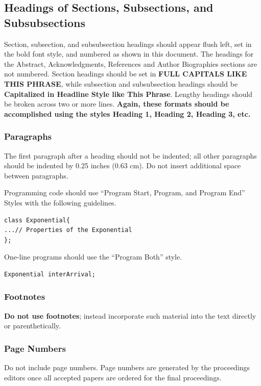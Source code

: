 \documentclass{wscpaperproc}
\theoremstyle{wsc}
\begin{document}
\subsection{Headings of Sections, Subsections, and Subsubsections}
Section, subsection, and subsubsection headings should appear flush left, set in the bold font style, and numbered as shown in this document. The headings for the Abstract, Acknowledgments, References and Author Biographies sections are not numbered. Section headings should be set in \textbf{FULL CAPITALS LIKE THIS PHRASE}, while subsection and subsubsection headings should be \textbf{Capitalized in Headline Style like This Phrase}. Lengthy headings should be broken across two or more lines. \textbf{Again, these formats should be accomplished using the styles Heading 1, Heading 2, Heading 3, etc.}

\subsubsection{Paragraphs}
The first paragraph after a heading should not be indented; all other paragraphs should be indented by 0.25 inches (0.63 cm). Do not insert additional space between paragraphs.

Programming code should use “Program Start, Program, and Program End” Styles with the following guidelines.

\begin{verbatim}
class Exponential{
...// Properties of the Exponential
};
\end{verbatim}

One-line programs should use the “Program Both” style.

\begin{verbatim}
Exponential interArrival;
\end{verbatim}

\subsubsection{Footnotes}
\textbf{Do not use footnotes}; instead incorporate such material into the text directly or parenthetically.

\subsubsection{Page Numbers}
Do not include page numbers. Page numbers are generated by the proceedings editors once all accepted papers are ordered for the final proceedings.
\end{document}
